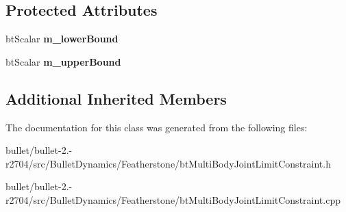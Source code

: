 \subsection*{Protected Attributes}
\begin{DoxyCompactItemize}
\item 
\hypertarget{classbt_multi_body_joint_limit_constraint_a040e8ced5273f676f5dcdec8728c2d93}{bt\+Scalar {\bfseries m\+\_\+lower\+Bound}}\label{classbt_multi_body_joint_limit_constraint_a040e8ced5273f676f5dcdec8728c2d93}

\item 
\hypertarget{classbt_multi_body_joint_limit_constraint_a8bc10d216ec92da50b9f08b151bd262c}{bt\+Scalar {\bfseries m\+\_\+upper\+Bound}}\label{classbt_multi_body_joint_limit_constraint_a8bc10d216ec92da50b9f08b151bd262c}

\end{DoxyCompactItemize}
\subsection*{Additional Inherited Members}


The documentation for this class was generated from the following files\+:\begin{DoxyCompactItemize}
\item 
bullet/bullet-\/2.-\/r2704/src/\+Bullet\+Dynamics/\+Featherstone/bt\+Multi\+Body\+Joint\+Limit\+Constraint.\+h\item 
bullet/bullet-\/2.-\/r2704/src/\+Bullet\+Dynamics/\+Featherstone/bt\+Multi\+Body\+Joint\+Limit\+Constraint.\+cpp\end{DoxyCompactItemize}
